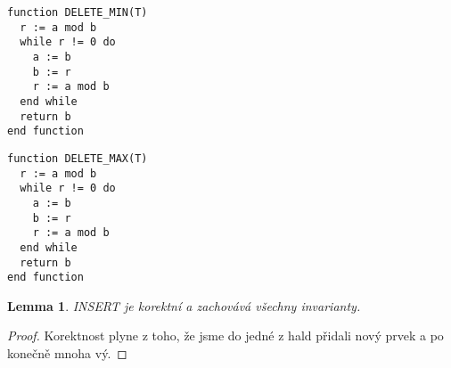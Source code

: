 \documentclass[12pt,a4paper]{article}
\theoremstyle{plain}
\newtheorem{lemma}[thm]{Lemma}
\begin{document}
\begin{lstlisting}
function DELETE_MIN(T) 
  r := a mod b
  while r != 0 do
    a := b
    b := r
    r := a mod b
  end while
  return b
end function
\end{lstlisting}

\begin{lstlisting}
function DELETE_MAX(T)
  r := a mod b
  while r != 0 do
    a := b
    b := r
    r := a mod b
  end while
  return b
end function
\end{lstlisting}

\begin{lemma} INSERT je korektní a zachovává všechny invarianty.
\end{lemma}
\begin{proof}
Korektnost plyne z toho, že jsme do jedné z hald přidali nový prvek a po konečně mnoha vý.
\end{proof}
\end{document}
